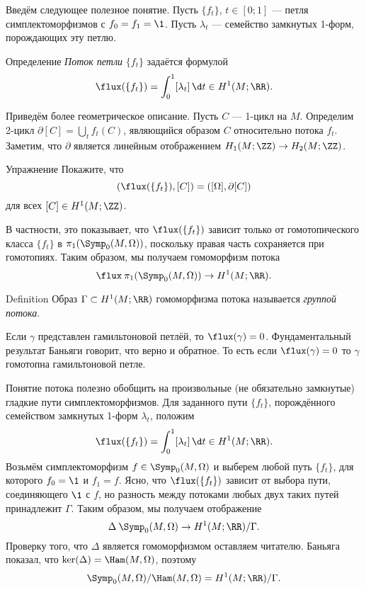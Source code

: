 Введём следующее полезное понятие.
Пусть $\{f_t\}$, $t\in[0;1]$ — петля симплектоморфизмов с $f_0 = f_1 = \1$.
Пусть ${\lambda_t}$ — семейство замкнутых 1-форм, порождающих эту петлю.

\begin{ex*}{Определение}
\emph{Поток петли} $\{f_t\}$ задаётся формулой
\index[symb]{$\flux$} 
\[\flux(\{f_t\}) = \int_0^1 [\lambda_t]\,\d t \in H^1(M;\RR).\]
\end{ex*}

Приведём более геометрическое описание.
Пусть $C$ — 1-цикл на $M$.
Определим 2-цикл $\partial[C] = \bigcup_t f_t(C)$, являющийся образом $C$ относительно потока $f_t$. 
Заметим, что $\partial$ является линейным отображением $H_1(M;\ZZ)\to H_2(M;\ZZ)$.

\begin{ex*}{Упражнение}
Покажите, что 
\[(\flux(\{f_t\}), [C]) = ([\Omega], \partial[C])\]
для всех $[C]\in H^1(M;\ZZ)$.
\end{ex*}

В частности, это показывает, что $\flux(\{f_t\})$ зависит только от гомотопического класса $\{f_t\}$ в $\pi_1 (\Symp_0(M,\Omega))$, поскольку правая часть сохраняется при гомотопиях.
Таким образом, мы получаем гомоморфизм потока
\[\flux\:\pi_1(\Symp_0(M,\Omega))\to H^1(M;\RR).\]

\begin{ex*}{Definition}
Образ $\Gamma \subset H^1(M;\RR)$ гомоморфизма потока называется
\emph{группой потока}. 
\end{ex*}


Если $\gamma$ представлен гамильтоновой петлёй, то $\flux(\gamma) = 0$.
Фундаментальный результат Баньяги \cite{B1} говорит,
что верно и обратное. 
То есть если $\flux(\gamma) = 0$ то $\gamma$ гомотопна гамильтоновой петле.

Понятие потока полезно обобщить на произвольные (не обязательно
замкнутые) гладкие пути симплектоморфизмов. 
Для заданного пути $\{f_t\}$, порождённого семейством замкнутых 1-форм
$\lambda_t$, положим  
\[\flux(\{f_t\})=\int_0^1[\lambda_t]\,\d t\in H^1(M;\RR).\]
Возьмём симплектоморфизм $f \in \Symp_0(M,\Omega)$ и выберем любой
путь $\{f_t\}$, для которого $f_0 = \1$ и $f_1 = f$.
Ясно, что $\flux (\{f_t\})$ зависит от выбора пути, соединяющего $\1$
с $f$, но разность между потоками любых двух таких путей принадлежит
$\Gamma$. 
Таким образом, мы получаем отображение
\[\Delta\:\Symp_0(M,\Omega)\to H^1(M;\RR)/\Gamma.\]
Проверку того, что $\Delta$ является гомоморфизмом оставляем читателю.
Баньяга показал, что $\ker(\Delta) = \Ham(M,\Omega)$, поэтому 
\[\Symp_0(M,\Omega)/\Ham(M,\Omega) = H^1(M;\RR)/\Gamma.\]

